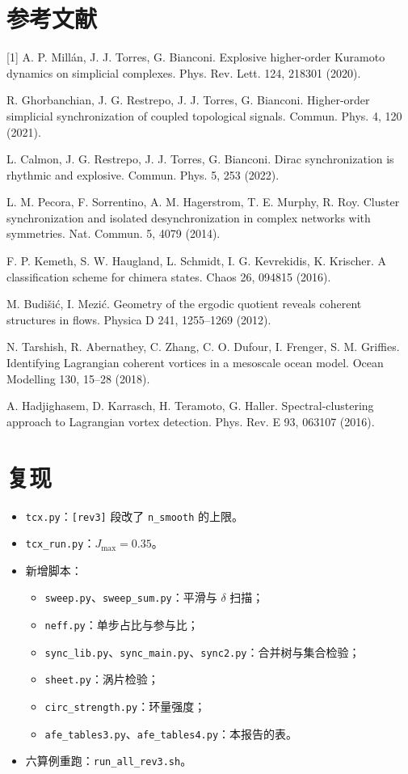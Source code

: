 \documentclass[10.5pt,a4paper]{article}
\theoremstyle{definition}
\theoremstyle{plain}
\theoremstyle{remark}
\begin{document}
\section*{参考文献}
\small
[1] A. P. Millán, J. J. Torres, G. Bianconi. Explosive higher-order Kuramoto dynamics on simplicial complexes. Phys. Rev. Lett. 124, 218301 (2020).\par\noindent [2] R. Ghorbanchian, J. G. Restrepo, J. J. Torres, G. Bianconi. Higher-order simplicial synchronization of coupled topological signals. Commun. Phys. 4, 120 (2021).\par\noindent [3] L. Calmon, J. G. Restrepo, J. J. Torres, G. Bianconi. Dirac synchronization is rhythmic and explosive. Commun. Phys. 5, 253 (2022).\par\noindent [4] L. M. Pecora, F. Sorrentino, A. M. Hagerstrom, T. E. Murphy, R. Roy. Cluster synchronization and isolated desynchronization in complex networks with symmetries. Nat. Commun. 5, 4079 (2014).\par\noindent [5] F. P. Kemeth, S. W. Haugland, L. Schmidt, I. G. Kevrekidis, K. Krischer. A classification scheme for chimera states. Chaos 26, 094815 (2016).\par\noindent [6] M. Budišić, I. Mezić. Geometry of the ergodic quotient reveals coherent structures in flows. Physica D 241, 1255–1269 (2012).\par\noindent [7] N. Tarshish, R. Abernathey, C. Zhang, C. O. Dufour, I. Frenger, S. M. Griffies. Identifying Lagrangian coherent vortices in a mesoscale ocean model. Ocean Modelling 130, 15–28 (2018).\par\noindent [8] A. Hadjighasem, D. Karrasch, H. Teramoto, G. Haller. Spectral-clustering approach to Lagrangian vortex detection. Phys. Rev. E 93, 063107 (2016).

\normalsize
\section*{复现}
\begin{itemize}
\item \texttt{tcx.py}：\texttt{[rev3]} 段改了 \texttt{n\_smooth} 的上限。
\item \texttt{tcx\_run.py}：$J_{\max}=0.35$。
\item 新增脚本：
  \begin{itemize}[leftmargin=1.2em]
  \item \texttt{sweep.py}、\texttt{sweep\_sum.py}：平滑与 $\delta$ 扫描；
  \item \texttt{neff.py}：单步占比与参与比；
  \item \texttt{sync\_lib.py}、\texttt{sync\_main.py}、\texttt{sync2.py}：合并树与集合检验；
  \item \texttt{sheet.py}：涡片检验；
  \item \texttt{circ\_strength.py}：环量强度；
  \item \texttt{afe\_tables3.py}、\texttt{afe\_tables4.py}：本报告的表。
  \end{itemize}
\item 六算例重跑：\texttt{run\_all\_rev3.sh}。
\end{itemize}
\end{document}
